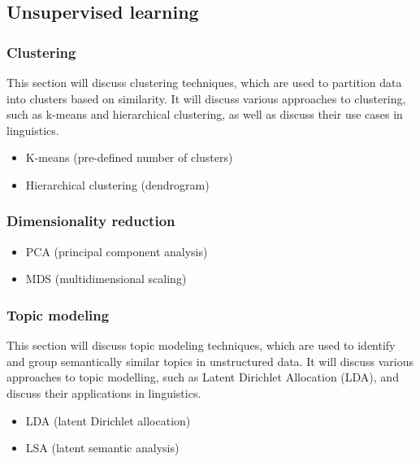 \documentclass[
  letterpaper,
]{latex/krantz}
\providecommand{\tightlist}{%
  \setlength{\itemsep}{0pt}\setlength{\parskip}{0pt}}\usepackage{longtable,booktabs,array}
\begin{document}
\hypertarget{eda-unsupervised}{%
\subsection{Unsupervised learning}\label{eda-unsupervised}}

\hypertarget{eda-clustering}{%
\subsubsection{Clustering}\label{eda-clustering}}

This section will discuss clustering techniques, which are used to
partition data into clusters based on similarity. It will discuss
various approaches to clustering, such as k-means and hierarchical
clustering, as well as discuss their use cases in linguistics.

\begin{itemize}
\tightlist
\item
  K-means (pre-defined number of clusters)
\item
  Hierarchical clustering (dendrogram)
\end{itemize}

\hypertarget{eda-dimensionality-reduction}{%
\subsubsection{Dimensionality
reduction}\label{eda-dimensionality-reduction}}

\begin{itemize}
\tightlist
\item
  PCA (principal component analysis)
\item
  MDS (multidimensional scaling)
\end{itemize}

\hypertarget{eda-topic-modeling}{%
\subsubsection{Topic modeling}\label{eda-topic-modeling}}

This section will discuss topic modeling techniques, which are used to
identify and group semantically similar topics in unstructured data. It
will discuss various approaches to topic modelling, such as Latent
Dirichlet Allocation (LDA), and discuss their applications in
linguistics.

\begin{itemize}
\tightlist
\item
  LDA (latent Dirichlet allocation)
\item
  LSA (latent semantic analysis)
\end{itemize}
\end{document}
